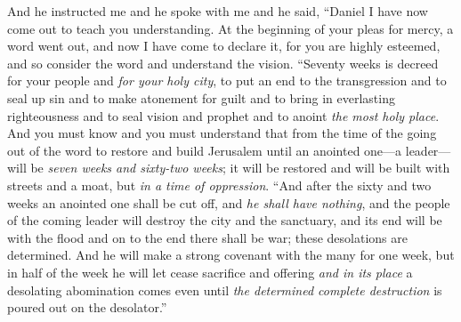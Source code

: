 \begin{biblechapter}
\verse And he instructed me and he spoke with me and he said, “Daniel I have now come out to teach you understanding.
\verse At the beginning of your pleas for mercy, a word went out, and now I have come to declare it, for you are highly esteemed, and so consider the word and understand the vision.
 “Seventy weeks is decreed for your people and \textit{for your holy city}, to put an end to the transgression and to seal up sin and to make atonement for guilt and to bring in everlasting righteousness and to seal vision and prophet and to anoint \textit{the most holy place}.
\verse And you must know and you must understand that from the time of the going out of the word to restore and build Jerusalem until an anointed one—a leader—will be \textit{seven weeks and sixty-two weeks}; it will be restored and will be built with streets and a moat, but \textit{in a time of oppression}.
\verse “And after the sixty and two weeks an anointed one shall be cut off, and \textit{he shall have nothing}, and the people of the coming leader will destroy the city and the sanctuary, and its end will be with the flood and on to the end there shall be war; these desolations are determined.
\verse And he will make a strong covenant with the many for one week, but in half of the week he will let cease sacrifice and offering \textit{and in its place} a desolating abomination comes even until \textit{the determined complete destruction} is poured out on the desolator.”
\end{biblechapter}

